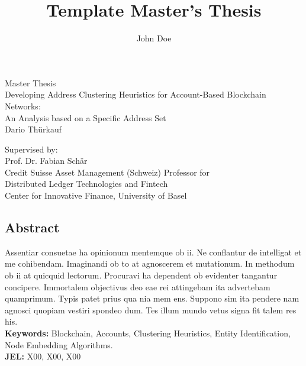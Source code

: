 \documentclass[12pt,a4paper,titlepage,oneside,english]{article}
\title{Template Master's Thesis}
\author{John Doe}
\begin{document}
\begin{center}
\vspace{1em}
\large{Master Thesis}\\
\huge Developing Address Clustering Heuristics for Account-Based Blockchain Networks:\\ An Analysis based on a Specific Address Set \\
\Large \vspace{1em}
Dario Thürkauf
\end{center}

\vspace{1em}
\normalsize
\begin{flushleft}
Supervised by:\\ 
Prof. Dr. Fabian Schär \\
Credit Suisse Asset Management (Schweiz) Professor for \\ 
Distributed Ledger Technologies and Fintech \\
Center for Innovative Finance, University of Basel
\end{flushleft}

\vspace{1em}
\onehalfspacing
\begin{center}
\section*{Abstract}
\end{center}
Assentiar consuetae ha opinionum mentemque ob ii. Ne conflantur de intelligat et me cohibendam. Imaginandi ob to at agnoscerem et mutationum. In methodum ob ii at quicquid lectorum. Procuravi ha dependent ob evidenter tangantur concipere. Immortalem objectivus deo eae rei attingebam ita advertebam quamprimum. Typis patet prius qua nia mem ens. Suppono sim ita pendere nam agnosci quopiam vestiri spondeo dum. Tes illum mundo vetus signa fit talem res his.  \\
\vfill
\textbf{Keywords:} Blockchain, Accounts, Clustering Heuristics, Entity Identification, Node Embedding Algorithms.\\
\noindent\textbf{JEL:} X00, X00, X00




\newpage
{}
\tableofcontents
\end{document}
